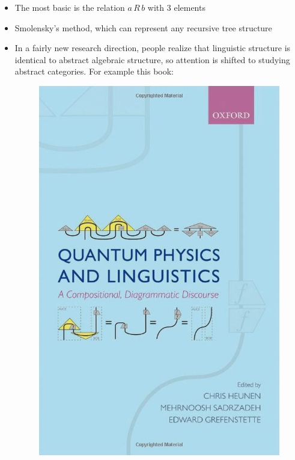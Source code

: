 \documentclass[12pt]{article}
\begin{document}
\begin{itemize}
\item The most basic is the relation $a \, R \, b$ with 3 elements
\item Smolensky's method, which can represent any recursive tree structure
\item In a fairly new research direction, people realize that linguistic structure is identical to abstract algebraic structure, so attention is shifted to studying abstract categories.  For example this book:
\begin{figure}[H]
\centering
\includegraphics[scale=0.3]{quantum-physics-and-linguistics-book-cover.png}
\end{figure}
\end{itemize}
\end{document}
